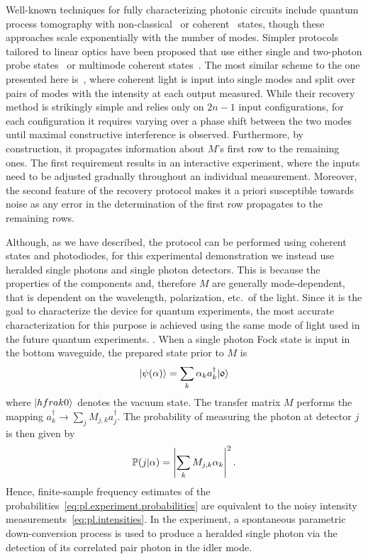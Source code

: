 Well-known techniques for fully characterizing photonic circuits include quantum process tomography with non-classical~\cite{Brien_2004_Quantum} or coherent~\cite{Keshari_2011_Quantum} states, though these approaches scale exponentially with the number of modes.
Simpler protocols tailored to linear optics have been proposed that use either single and two-photon probe states~\cite{Laing_2012_SuperStable,Dhand_2016_Accurate,Spagnolo_2017_Learning} or multimode coherent states~\cite{Keshari_2013_Direct,Tillmann_2016_On}.
The most similar scheme to the one presented here is~\cite{Keshari_2013_Direct}, where coherent light is input into single modes and split over pairs of modes with the intensity at each output measured.
While their recovery method is strikingly simple and relies only on $2n-1$ input configurations, for each configuration it requires varying over a phase shift between the two modes until maximal constructive interference is observed.
Furthermore, by construction, it propagates information about ${M}$'s first row to the remaining ones.
The first requirement results in an interactive experiment, where the inputs need to be adjusted gradually throughout an individual measurement.
Moreover, the second feature of the recovery protocol makes it a priori susceptible towards noise as any error in the determination of the first row propagates to the remaining rows.

Although, as we have described, the protocol can be performed using coherent states and photodiodes, for this experimental demonstration we instead use heralded single photons and single photon detectors.
This is because the properties of the components and, therefore $ M$ are generally mode-dependent, that is dependent on the wavelength, polarization, etc.\ of the light.
Since it is the goal to characterize the device for quantum experiments, the most accurate characterization for this purpose is achieved using the same mode of light used in the future quantum experiments. .
When a single photon Fock state is input in the bottom waveguide, the prepared state prior to $ M$ is
\[
  \ket{\psi({\alpha})} = \sum_k \alpha_k a_k^{\dag} \ket{\mathfrak{0}}
\]
where $\ket{hfrak{0}}$ denotes the vacuum state.
The transfer matrix $M$ performs the mapping $a_k^{\dag} \rightarrow \sum_j M_{j,k}a_j^{\dag}$.
The probability of measuring the photon at detector $j$ is then given by
\[
  \mathbb{P}(j|{\alpha}) = \left| \sum_k M_{j,k} \alpha_k \right|^2.
  \label{eq:pl.experiment.probabilities}
\]
Hence, finite-sample frequency estimates of the probabilities~\eqref{eq:pl.experiment.probabilities} are equivalent to the noisy intensity measurements~\eqref{eq:pl.intensities}.
In the experiment, a spontaneous parametric down-conversion process is used to produce a heralded single photon via the detection of its correlated pair photon in the idler mode.

